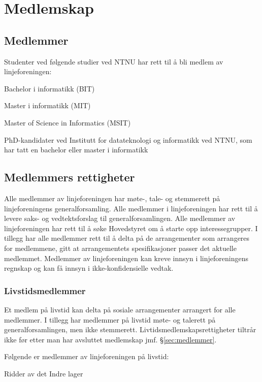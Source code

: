\chapter{Medlemskap}\label{chapter:medlemskap}

\section{Medlemmer}{\label{sec:medlemmer}
\vspace{23pt}

Studenter ved følgende studier ved NTNU har rett til å bli medlem av linjeforeningen:
\begin{liste}
	\item Bachelor i informatikk (BIT)
	\item Master i informatikk (MIT)
	\item Master of Science in Informatics (MSIT)
    \item PhD-kandidater ved Institutt for datateknologi og informatikk ved NTNU, som har tatt en bachelor eller master i informatikk
\end{liste}
}
\section{Medlemmers rettigheter}
\vspace{23pt}
Alle medlemmer av linjeforeningen har møte-, tale- og stemmerett på linjeforeningens generalforsamling. Alle medlemmer i linjeforeningen har rett til å levere saks- og vedtektsforslag til generalforsamlingen. Alle medlemmer av linjeforeningen har rett til å søke Hovedstyret om å starte opp interessegrupper. I tillegg har alle medlemmer rett til å delta på de arrangementer som arrangeres for medlemmene, gitt at arrangementets spesifikasjoner passer det aktuelle medlemmet. Medlemmer av linjeforeningen kan kreve innsyn i linjeforeningens regnskap og kan få innsyn i ikke-konfidensielle vedtak.

\subsection{Livstidsmedlemmer}{
Et medlem på livstid kan delta på sosiale arrangementer arrangert for alle medlemmer. I tillegg har medlemmer på livstid møte- og talerett på generalforsamlingen, men ikke stemmerett. Livtidsmedlemskapsrettigheter tiltrår ikke før etter man har avsluttet medlemskap jmf. §\ref{sec:medlemmer}.

Følgende er medlemmer av linjeforeningen på livstid:
\begin{liste}
	\item Ridder av det Indre lager
\end{liste}

}
